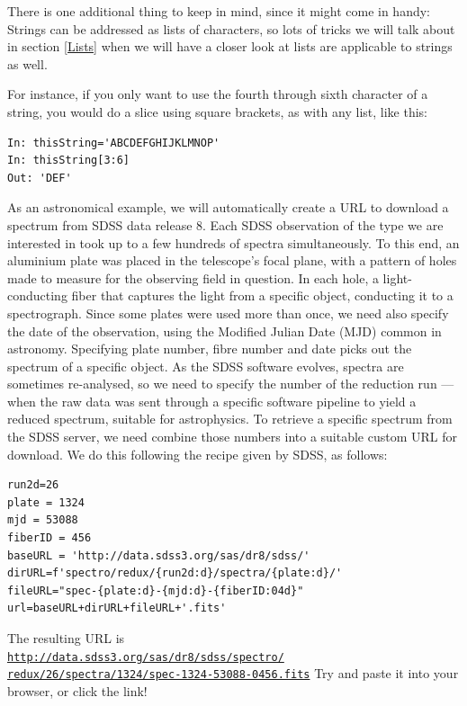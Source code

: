 \documentclass[twocolumn,apj]{openjournal}
\begin{document}
There is one additional thing to keep in mind, since it might come in handy: Strings can be addressed as lists of characters, so lots of tricks we will talk about in section \ref{Lists} when we will have a closer look at lists are applicable to strings as well. 

For instance, if you only want to use the fourth through sixth character of a string, you would do a slice using square brackets, as with any list, like this:
\begin{lstlisting}
In: thisString='ABCDEFGHIJKLMNOP'
In: thisString[3:6]
Out: 'DEF'
\end{lstlisting}

As an astronomical example, we will automatically create a URL to download a spectrum from SDSS data release 8. Each SDSS observation of the type we are interested in took up to a few hundreds of spectra simultaneously. To this end, an aluminium plate was placed in the telescope's focal plane, with a pattern of holes made to measure for the observing field in question. In each hole, a light-conducting fiber that captures the light from a specific object, conducting it to a spectrograph. Since some plates were used more than once, we need also specify the date of the observation, using the Modified Julian Date (MJD) common in astronomy. Specifying plate number, fibre number and date picks out the spectrum of a specific object. As the SDSS software evolves, spectra are sometimes re-analysed, so we need to specify the number of the reduction run --- when the raw data was sent through a specific software pipeline to yield a reduced spectrum, suitable for astrophysics. To retrieve a specific spectrum from the SDSS server, we need combine those numbers into a suitable custom URL for download. We do this following the recipe given by SDSS, as follows:

\begin{lstlisting}[breaklines=true]
run2d=26
plate = 1324
mjd = 53088
fiberID = 456
baseURL = 'http://data.sdss3.org/sas/dr8/sdss/'
dirURL=f'spectro/redux/{run2d:d}/spectra/{plate:d}/'
fileURL="spec-{plate:d}-{mjd:d}-{fiberID:04d}"
url=baseURL+dirURL+fileURL+'.fits'
\end{lstlisting}
The resulting URL is\\{\footnotesize
\href{http://data.sdss3.org/sas/dr8/sdss/spectro/redux/26/spectra/1324/spec-1324-53088-0456.fits}{\tt http://data.sdss3.org/sas/dr8/sdss/spectro/\\redux/26/spectra/1324/spec-1324-53088-0456.fits}
}
Try and paste it into your browser, or click the link!
\end{document}

